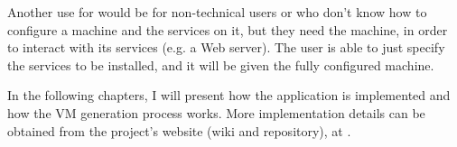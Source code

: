 Another use for \project would be for non-technical users or who don't know how
to configure a machine and the services on it, but they need the machine, in
order to interact with its services (e.g. a Web server). The user is able to
just specify the services to be installed, and it will be given the fully
configured machine.

In the following chapters, I will present how the application is implemented
and how the VM generation process works. More implementation details can be
obtained from the project's website (wiki and repository), at
\cite{vmgen-ixlabs}.
